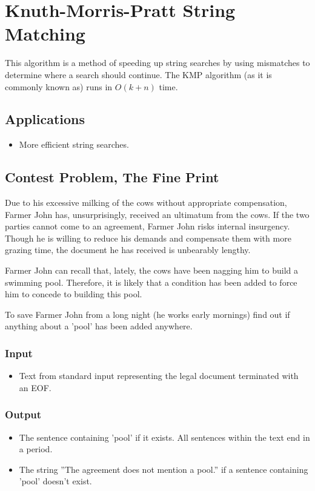 \section{Knuth-Morris-Pratt String Matching}
This algorithm is a method of speeding up string searches by using mismatches to determine where a search should continue.
The KMP algorithm (as it is commonly known as) runs in $O(k + n)$ time.

\subsection{Applications}
\begin{itemize}
	\item More efficient string searches.
\end{itemize}

\subsection{Contest Problem, The Fine Print}
Due to his excessive milking of the cows without appropriate compensation, Farmer John has, unsurprisingly, received an ultimatum from the cows.
If the two parties cannot come to an agreement, Farmer John risks internal insurgency.
Though he is willing to reduce his demands and compensate them with more grazing time, the document he has received is unbearably lengthy.

Farmer John can recall that, lately, the cows have been nagging him to build a swimming pool.
Therefore, it is likely that a condition has been added to force him to concede to building this pool.

To save Farmer John from a long night (he works early mornings) find out if anything about a 'pool' has been added anywhere.

\subsubsection{Input}
\begin{itemize}
	\item Text from standard input representing the legal document terminated with an EOF.
\end{itemize}


\subsubsection{Output}
\begin{itemize}
	\item The sentence containing 'pool' if it exists. All sentences within the text end in a period.
	\item The string ''The agreement does not mention a pool.'' if a sentence containing 'pool' doesn't exist.
\end{itemize}



